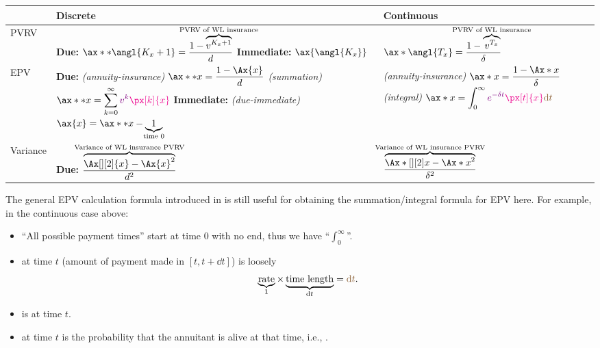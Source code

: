 \begin{enumerate}
\begin{enumerate}[label={(\arabic*)}]
\begin{center}
\begin{tabular}{lll}
\toprule
&Discrete&Continuous \\
\midrule
PVRV&\makecell[l]{\textbf{Due:} \(\displaystyle \ax**{\angl{K_x+1}}
=\frac{1-\overbrace{v^{K_x+1}}^{\mathclap{\text{PVRV of WL insurance}}}}{d}\) \\
\textbf{Immediate:} \(\ax{\angl{K_x}}\)
}&\(\displaystyle \ax*{\angl{T_x}}=\frac{1-\overbrace{v^{T_x}}^{\mathclap{\text{PVRV of WL insurance}}}}{\delta}\) \\
\midrule
EPV&
\makecell[l]{\textbf{Due:} \\
\emph{(annuity-insurance)} \(\displaystyle \ax**{x}=\frac{1-\Ax{x}}{d}\)\\
\emph{(summation)} \(\displaystyle \ax**{x}=\sum_{k=0}^{\infty}\vc{v^k}\mgc{\px[k]{x}}\)\\
\textbf{Immediate:} \\
\emph{(due-immediate)} \(\ax{x}=\ax**{x}-\underbrace{1}_{\mathclap{\text{time 0}}}\)
}
&\makecell[l]{\emph{(annuity-insurance)} \(\displaystyle \ax*{x}=\frac{1-\Ax*{x}}{\delta}\) \\
\emph{(integral)} \(\displaystyle \ax*{x}=\int_{0}^{\infty}\vc{e^{-\delta t}}\mgc{\px[t]{x}}\brc{\dd{t}}\)
} \\
\midrule
Variance&\textbf{Due:} \(\displaystyle \frac{\overbrace{\Ax[][2]{x}-\Ax{x}^{2}}^{\mathclap{\text{Variance of WL insurance PVRV}}}}{d^{2}}\) 
& \(\displaystyle \frac{\overbrace{\Ax*[][2]{x}-\Ax*{x}^{2}}^{\mathclap{\text{Variance of WL insurance PVRV}}}}{\delta^{2}}\)\\
\bottomrule
\end{tabular}
\end{center}
The general EPV calculation formula introduced in 
is still useful for obtaining the summation/integral formula for EPV here. For example, in the continuous case above:
\begin{itemize}
\item ``All possible payment times'' start at time 0 with no end, thus we have
``\(\int_{0}^{\infty}\)''.
\item {} at time \(t\) (amount of payment made in
\([t,t+\dd{t}]\)) is loosely \[
\underbrace{\text{rate}}_{1}\times \underbrace{\text{time length}}_{\dd{t}}
=\brc{\dd{t}}.\]
\item {} is  at time \(t\).
\item {} at time \(t\) is the probability
that the annuitant is alive at that time, i.e., .
\end{itemize}
\end{enumerate}


\end{enumerate}
